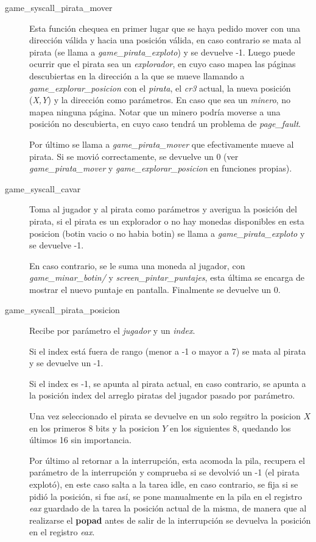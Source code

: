 \begin{description}
\item[game_syscall_pirata_mover] Esta función chequea en primer lugar que se
haya pedido mover con una dirección válida y hacia una posición válida, en caso
contrario se mata al pirata (se llama a {\it game_pirata_exploto\/}) y se
devuelve -1. Luego puede ocurrir que el pirata sea un {\it explorador\/}, en
cuyo caso mapea las páginas descubiertas en la dirección a la que se mueve
llamando a {\it game_explorar_posicion\/} con el {\it pirata\/}, el {\it cr3\/}
actual, la nueva posición ({\it X,Y\/}) y la dirección como parámetros. En caso
que sea un {\it minero\/}, no mapea ninguna página. Notar que un minero podría
moverse a una posición no descubierta, en cuyo caso tendrá un problema de
{\it page_fault\/}.

Por último se llama a {\it game_pirata_mover\/} que efectivamente mueve al
pirata. Si se movió correctamente, se devuelve un 0 (ver
{\it game_pirata_mover\/} y {\it game_explorar_posicion\/} en funciones
propias).

\item[game_syscall_cavar] Toma al jugador y al pirata como parámetros y averigua
la posición del pirata, si el pirata es un explorador o no hay monedas
disponibles en esta posicion (botin vacio o no habia botin) se llama a
{\it game_pirata_exploto\/} y se devuelve -1.

En caso contrario, se le suma una moneda al jugador, con {\it game_minar_botin/}
y {\it screen_pintar_puntajes\/}, esta última se encarga de mostrar el nuevo
puntaje en pantalla. Finalmente se devuelve un 0.

\item[game_syscall_pirata_posicion] Recibe por parámetro el {\it jugador\/} y un
{\it index\/}.

Si el index está fuera de rango (menor a -1 o mayor a 7) se mata al pirata y se
devuelve un -1.

Si el index es -1, se apunta al pirata actual, en caso contrario, se apunta a la
posición index del arreglo piratas del jugador pasado por parámetro.

Una vez seleccionado el pirata se devuelve en un solo regsitro la posicion $X$
en los primeros 8 bits y la posicion $Y$ en los siguientes 8, quedando los
últimos 16 sin importancia.

Por último al retornar a la interrupción, esta acomoda la pila, recupera el
parámetro de la interrupción y comprueba si se devolvió un -1
(el pirata explotó), en este caso salta a la tarea idle, en caso contrario, se
fija si se pidió la posición, si fue así, se pone manualmente en la pila en el
registro {\it eax\/} guardado de la tarea la posición actual de la misma, de
manera que al realizarse el {\bf popad} antes de salir de la interrupción se
devuelva la posición en el registro {\it eax\/}.
\end{description}

